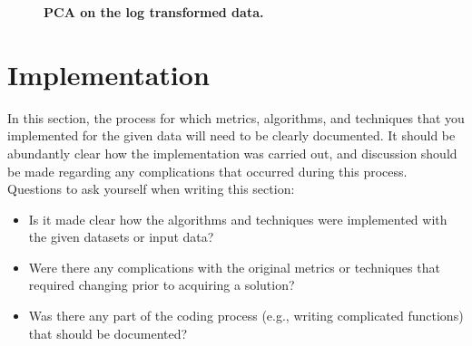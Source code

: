 \documentclass[twoside,openright,titlepage,numbers=noenddot,headinclude,%
               footinclude=true,cleardoublepage=empty,abstractoff,BCOR=5mm,%
               paper=a4,fontsize=11pt,ngerman,american]{scrreprt}
\numberwithin{theorem}{chapter}
\numberwithin{definition}{chapter}
\numberwithin{algorithm}{chapter}
\numberwithin{figure}{chapter}
\numberwithin{table}{chapter}
\numberwithin{equation}{chapter}
\begin{document}
\begin{figure}[!hbtp]
\centering
    
    \caption{\textbf{PCA on the log transformed data. }}
\end{figure}

\section*{Implementation}
In this section, the process for which metrics, algorithms, and techniques that you implemented for the given data will need to be clearly documented. It should be abundantly clear how the implementation was carried out, and discussion should be made regarding any complications that occurred during this process. Questions to ask yourself when writing this section:
\begin{itemize}%
\item Is it made clear how the algorithms and techniques were implemented with the given datasets or input data?
\item Were there any complications with the original metrics or techniques that required changing prior to acquiring a solution?
\item Was there any part of the coding process (e.g., writing complicated functions) that should be documented?
\end{itemize}
\end{document}
